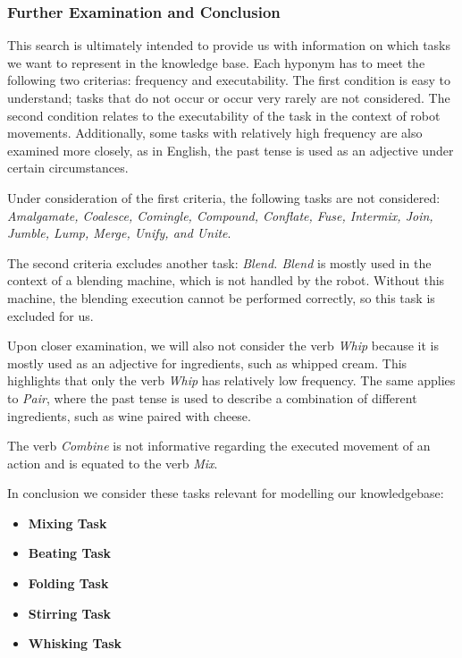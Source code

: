 \subsubsection{Further Examination and Conclusion}
This search is ultimately intended to provide us with information on which tasks we want to represent in the knowledge base. 
Each hyponym has to meet the following two criterias: frequency and executability. 
The first condition is easy to understand; tasks that do not occur or occur very rarely are not considered. 
The second condition relates to the executability of the task in the context of robot movements. 
Additionally, some tasks with relatively high frequency are also examined more closely, as in English, the past tense is used as an adjective under certain circumstances.

Under consideration of the first criteria, the following tasks are not considered: \textit{Amalgamate, Coalesce, Comingle, Compound, Conflate, Fuse, Intermix, Join, Jumble, Lump, Merge, Unify, and Unite}.

The second criteria excludes another task: \textit{Blend. Blend} is mostly used in the context of a blending machine, which is not handled by the robot. Without this machine, the blending execution cannot be performed correctly, so this task is excluded for us.

Upon closer examination, we will also not consider the verb \textit{Whip} because it is mostly used as an adjective for ingredients, such as whipped cream. This highlights that only the verb \textit{Whip} has relatively low frequency. The same applies to \textit{Pair}, where the past tense is used to describe a combination of different ingredients, such as wine paired with cheese.

The verb \textit{Combine} is not informative regarding the executed movement of an action and is equated to the verb \textit{Mix}.

In conclusion we consider these tasks relevant for modelling our knowledgebase:
\begin{itemize}
  \item \textbf{Mixing Task}
  \item \textbf{Beating Task}
  \item \textbf{Folding Task}
  \item \textbf{Stirring Task}
  \item \textbf{Whisking Task}
\end{itemize}

